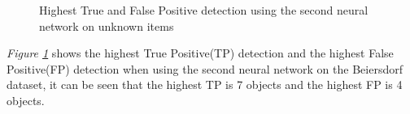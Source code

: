 \begin{figure}[h]
 \centering
 \hfill
 
 \caption{Highest True and False Positive detection using the second neural network on unknown items}
 \label{fig:v2max}
\end{figure}

\textit{Figure \ref{fig:v2max}} shows the highest True Positive(TP) detection and the highest False Positive(FP) detection when using the second neural network on the Beiersdorf dataset, it can be seen that the highest TP is 7 objects and the highest FP is 4 objects.

\clearpage

